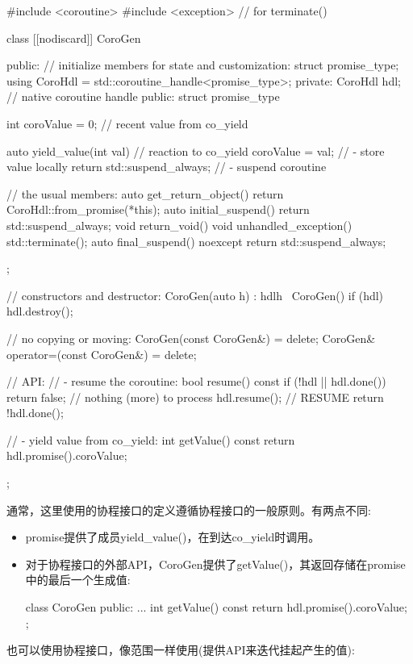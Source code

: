 \begin{cpp}
#include <coroutine>
#include <exception> // for terminate()

class [[nodiscard]] CoroGen {
public:
	// initialize members for state and customization:
	struct promise_type;
	using CoroHdl = std::coroutine_handle<promise_type>;
private:
	CoroHdl hdl; // native coroutine handle
public:
	struct promise_type {
		int coroValue = 0; // recent value from co_yield

		auto yield_value(int val) { // reaction to co_yield
			coroValue = val; // - store value locally
			return std::suspend_always{}; // - suspend coroutine
		}

		// the usual members:
		auto get_return_object() { return CoroHdl::from_promise(*this); }
		auto initial_suspend() { return std::suspend_always{}; }
		void return_void() { }
		void unhandled_exception() { std::terminate(); }
		auto final_suspend() noexcept { return std::suspend_always{}; }
	};

	// constructors and destructor:
	CoroGen(auto h) : hdl{h} { }
	~CoroGen() { if (hdl) hdl.destroy(); }

	// no copying or moving:
	CoroGen(const CoroGen&) = delete;
	CoroGen& operator=(const CoroGen&) = delete;

	// API:
	// - resume the coroutine:
	bool resume() const {
		if (!hdl || hdl.done()) {
			return false; // nothing (more) to process
			}
			hdl.resume(); // RESUME
			return !hdl.done();
		}

	// - yield value from co_yield:
	int getValue() const {
		return hdl.promise().coroValue;
	}
};
\end{cpp}

通常，这里使用的协程接口的定义遵循协程接口的一般原则。有两点不同:

\begin{itemize}
\item
promise提供了成员yield\_value()，在到达co\_yield时调用。

\item
对于协程接口的外部API，CoroGen提供了getValue()，其返回存储在promise中的最后一个生成值:

\begin{cpp}
class CoroGen {
	public:
	...
	int getValue() const {
		return hdl.promise().coroValue;
	}
};
\end{cpp}
\end{itemize}


也可以使用协程接口，像范围一样使用(提供API来迭代挂起产生的值):

